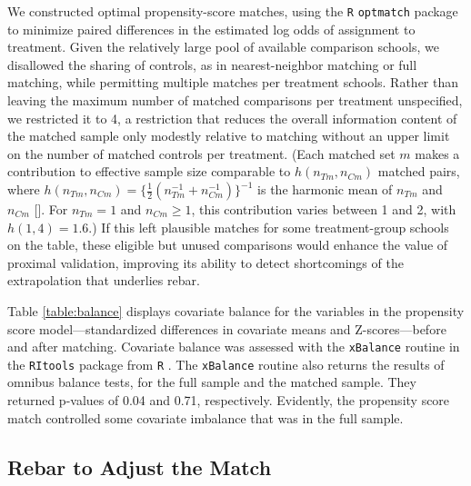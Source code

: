 \documentclass[12pt]{article}\usepackage[]{graphicx}\usepackage[]{color}
\newcommand{\match}{m}
\begin{document}
We constructed optimal propensity-score matches, using the \verb|R|
\verb|optmatch| package \citep{hansen2007optmatch} to minimize paired
differences in the estimated log odds of assignment to treatment.
Given the relatively large pool of available comparison schools, we
disallowed the sharing of controls, as in nearest-neighbor matching or
full matching, while permitting multiple matches per treatment
schools. Rather than leaving the maximum number of matched comparisons
per treatment unspecified, we restricted it to 4, a restriction that
reduces the overall information content of the matched sample
\citep{cinarZubizarreta2016} only modestly relative to matching
without an upper limit on the number of matched controls per
treatment.  (Each matched set $\match$ makes a contribution to
effective sample size comparable to $h(n_{T\match}, n_{C\match})$
matched pairs, where
$h(n_{T\match},n_{C\match}) = \{\frac{1}{2}(n_{T\match}^{-1} + n_{C\match}^{-1})\}^{-1}$ is
the harmonic mean of $n_{T\match}$ and $n_{C\match}$
[\citealp{hansen2011propensity,cinarZubizarreta2016}].  For $n_{T\match}=1$
and $n_{C\match}\geq 1$, this contribution varies between 1 and 2, with
$h(1, 4)=1.6$.)  If this left plausible matches for some
treatment-group schools on the table, these eligible but unused
comparisons would enhance the value of proximal validation, improving
its ability to detect shortcomings of the extrapolation that underlies rebar.

Table \ref{table:balance} displays covariate balance for the variables
in the propensity score model---standardized differences in covariate
means and Z-scores---before and after matching.
Covariate balance was assessed with the \verb|xBalance| routine in the
\verb|RItools| package from \verb|R| \citep{bowers2010ritools}.
The \verb|xBalance| routine also returns the results of omnibus
balance tests, for the full sample and the matched sample.
They returned p-values of 0.04
and 0.71, respectively.
Evidently, the propensity score match controlled some covariate
imbalance that was in the full sample.


\subsection{Rebar to Adjust the Match}
\end{document}
